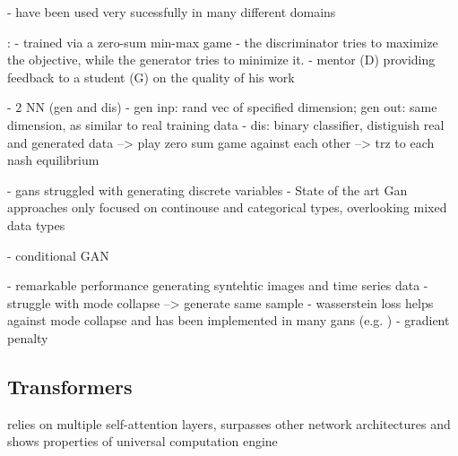 \cite{goodfellow2020GenerativeAdversarialNetworks}
- have been used very sucessfully in many different domains \cite{li2022TTSGANTransformerbasedTimeSeries}
 



\cite{zhao2022CTABGANEnhancingTabular}:
- trained via a zero-sum min-max game 
- the discriminator tries to maximize the objective, while the generator tries to minimize it.
- mentor (D) providing feedback to a student (G) on the quality of his work


\cite{li2022TTSGANTransformerbasedTimeSeries}
- 2 NN (gen and dis)
- gen inp: rand vec of specified dimension; gen out: same dimension, as similar to real training data
- dis: binary classifier, distiguish real and generated data
--> play zero sum game against each other
--> trz to each nash equilibrium

- gans struggled with generating discrete variables \cite{torfi2020CorGANCorrelationCapturingConvolutionala}
- State of the art Gan approaches only focused on continouse and categorical types, overlooking mixed data types \cite{zhao2022CTABGANEnhancingTabular}

- conditional GAN \cite{mirza2014ConditionalGenerativeAdversarial}


- remarkable performance generating syntehtic images and time series data \cite{mckeever2020SynthesisingTabularDatasets}
- struggle with mode collapse --> generate same sample \cite{torfi2020CorGANCorrelationCapturingConvolutionala}
- wasserstein loss helps against mode collapse \cite{frogner2015LearningWassersteinLoss} \cite{arjovsky2017WassersteinGenerativeAdversarial} and has been implemented in many gans (e.g. \cite{zhao2022CTABGANEnhancingTabular})
- gradient penalty \cite{gulrajani2017ImprovedTrainingWasserstein}


\subsection{Transformers}
\label{ch:preliminaries-generativeAlgorithms-transformers}
relies on multiple self-attention layers, surpasses other network architectures and shows properties of universal computation engine \cite{li2022TTSGANTransformerbasedTimeSeries}



